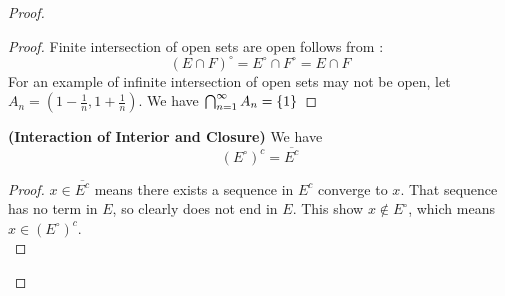 \documentclass{report}
\begin{document}
\begin{proof}
\begin{proof}
Finite intersection of open sets are open follows from :
\begin{equation}
  (E\cap F)^\circ =E^\circ \cap F^\circ =E\cap F
\end{equation}
For an example of infinite intersection of open sets may not be open, let $A_n=(1-\frac{1}{n},1+\frac{1}{n})$. We have $\bigcap_{n=1}^\infty A_n=\{ 1 \}$
\end{proof}
\begin{theorem}
\label{3.3.6}
\textbf{(Interaction of Interior and Closure)} We have
\begin{equation}
  (E^\circ )^c=\overline{E^c}
\end{equation}
\end{theorem}
\begin{proof}
$x\in \overline{E^c}$ means there exists a sequence in $E^c$ converge to  $x$. That sequence has no term in $E$, so clearly does not end in  $E$. This show  $x\not \in E^\circ $, which means $x\in (E^\circ )^c$.\\


\end{proof}
\end{proof}
\end{document}
